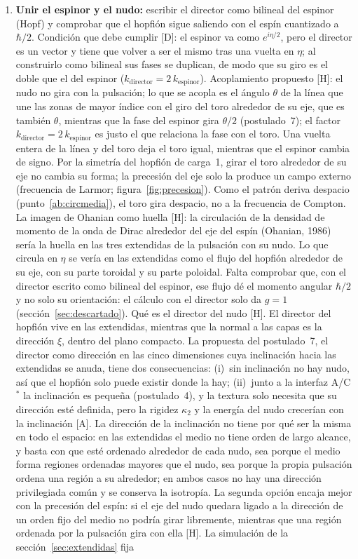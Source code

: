 \documentclass[11pt,a4paper]{article}
\newcommand{\st}[1]{\textup{[#1]}}
\newcommand{\Cst}{C\ensuremath{^{*}}}
\begin{document}
\begin{enumerate}[label=\arabic*.,ref=\arabic*,leftmargin=*]
\item \label{ab:espinor-nudo}\textbf{Unir el espinor y el nudo:} escribir el director como bilineal del espinor (Hopf) y comprobar que el hopfión sigue saliendo con el espín cuantizado a $\hbar/2$. Condición que debe cumplir \st{D}: el espinor va como $e^{i\eta/2}$, pero el director es un vector y tiene que volver a ser el mismo tras una vuelta en $\eta$; al construirlo como bilineal sus fases se duplican, de modo que su giro es el doble que el del espinor ($k_{\mathrm{director}}=2\,k_{\mathrm{espinor}}$). Acoplamiento propuesto \st{H}: el nudo no gira con la pulsación; lo que se acopla es el ángulo $\theta$ de la línea que une las zonas de mayor índice con el giro del toro alrededor de su eje, que es también $\theta$, mientras que la fase del espinor gira $\theta/2$ (postulado~7); el factor $k_{\mathrm{director}}=2\,k_{\mathrm{espinor}}$ es justo el que relaciona la fase con el toro. Una vuelta entera de la línea y del toro deja el toro igual, mientras que el espinor cambia de signo. Por la simetría del hopfión de carga~1, girar el toro alrededor de su eje no cambia su forma; la precesión del eje solo la produce un campo externo (frecuencia de Larmor; figura~\ref{fig:precesion}). Como el patrón deriva despacio (punto~\ref{ab:circmedia}), el toro gira despacio, no a la frecuencia de Compton. La imagen de Ohanian como huella \st{H}: la circulación de la densidad de momento de la onda de Dirac alrededor del eje del espín (Ohanian, 1986) sería la huella en las tres extendidas de la pulsación con su nudo. Lo que circula en $\eta$ se vería en las extendidas como el flujo del hopfión alrededor de su eje, con su parte toroidal y su parte poloidal. Falta comprobar que, con el director escrito como bilineal del espinor, ese flujo dé el momento angular $\hbar/2$ y no solo su orientación: el cálculo con el director solo da $g=1$ (sección~\ref{sec:descartado}). Qué es el director del nudo \st{H}. El director del hopfión vive en las extendidas, mientras que la normal a las capas es la dirección $\xi$, dentro del plano compacto. La propuesta del postulado~7, el director como dirección en las cinco dimensiones cuya inclinación hacia las extendidas se anuda, tiene dos consecuencias: (i)~sin inclinación no hay nudo, así que el hopfión solo puede existir donde la hay; (ii)~junto a la interfaz A/\Cst{} la inclinación es pequeña (postulado~4), y la textura solo necesita que su dirección esté definida, pero la rigidez $\kappa_2$ y la energía del nudo crecerían con la inclinación \st{A}. La dirección de la inclinación no tiene por qué ser la misma en todo el espacio: en las extendidas el medio no tiene orden de largo alcance, y basta con que esté ordenado alrededor de cada nudo, sea porque el medio forma regiones ordenadas mayores que el nudo, sea porque la propia pulsación ordena una región a su alrededor; en ambos casos no hay una dirección privilegiada común y se conserva la isotropía. La segunda opción encaja mejor con la precesión del espín: si el eje del nudo quedara ligado a la dirección de un orden fijo del medio no podría girar libremente, mientras que una región ordenada por la pulsación gira con ella \st{H}. La simulación de la sección~\ref{sec:extendidas} fija 
\end{enumerate}
\end{document}
